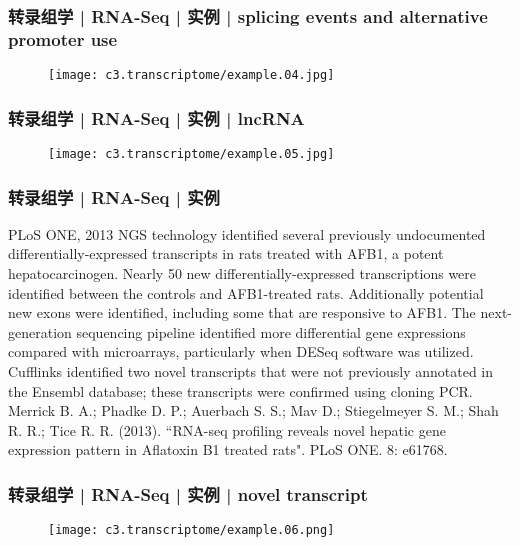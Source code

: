 \begin{frame}
  \frametitle{转录组学 | RNA-Seq | 实例 | splicing events and alternative promoter use}
  \begin{figure}
    \centering
    \texttt{[image: c3.transcriptome/example.04.jpg]}
  \end{figure}
\end{frame}

\begin{frame}
  \frametitle{转录组学 | RNA-Seq | 实例 | lncRNA}
  \begin{figure}
    \centering
    \texttt{[image: c3.transcriptome/example.05.jpg]}
  \end{figure}
\end{frame}

\begin{frame}
  \frametitle{转录组学 | RNA-Seq | 实例}
  \begin{block}{PLoS ONE, 2013}
  NGS technology identified several previously undocumented differentially-expressed transcripts in rats treated with AFB1, a potent hepatocarcinogen. Nearly 50 new differentially-expressed transcriptions were identified between the controls and AFB1-treated rats. Additionally potential new exons were identified, including some that are responsive to AFB1. The next-generation sequencing pipeline identified more differential gene expressions compared with microarrays, particularly when DESeq software was utilized. Cufflinks identified two novel transcripts that were not previously annotated in the Ensembl database; these transcripts were confirmed using cloning PCR.\\
  \vspace{0.5em}
Merrick B. A.; Phadke D. P.; Auerbach S. S.; Mav D.; Stiegelmeyer S. M.; Shah R. R.; Tice R. R. (2013). ``RNA-seq profiling reveals novel hepatic gene expression pattern in Aflatoxin B1 treated rats". PLoS ONE. 8: e61768. 
  \end{block}
\end{frame}

\begin{frame}
  \frametitle{转录组学 | RNA-Seq | 实例 | novel transcript}
  \begin{figure}
    \centering
    \texttt{[image: c3.transcriptome/example.06.png]}
  \end{figure}
\end{frame}

